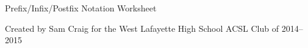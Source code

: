 \documentclass[12pt,letterpaper]{article}
\begin{document}
\begin{center}
  Prefix/Infix/Postfix Notation Worksheet

  Created by Sam Craig for the West Lafayette High School ACSL Club of 2014--2015
\end{center}
\end{document}
